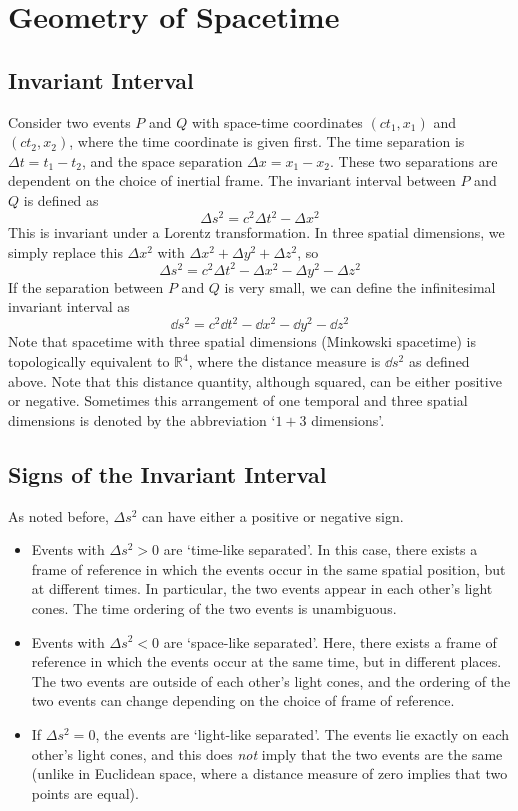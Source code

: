 \documentclass{article}
\begin{document}
\section{Geometry of Spacetime}
\subsection{Invariant Interval}
Consider two events $P$ and $Q$ with space-time coordinates $(ct_1, x_1)$ and $(ct_2, x_2)$, where the time coordinate is given first. The time separation is $\Delta t = t_1 - t_2$, and the space separation $\Delta x = x_1 - x_2$. These two separations are dependent on the choice of inertial frame. The invariant interval between $P$ and $Q$ is defined as
\[ \Delta s^2 = c^2 \Delta t^2 - \Delta x^2 \]
This is invariant under a Lorentz transformation. %
In three spatial dimensions, we simply replace this $\Delta x^2$ with $\Delta x^2 + \Delta y^2 + \Delta z^2$, so
\[ \Delta s^2 = c^2 \Delta t^2 - \Delta x^2 - \Delta y^2 - \Delta z^2 \]
If the separation between $P$ and $Q$ is very small, we can define the infinitesimal invariant interval as
\[ \dd{s}^2 = c^2\dd{t}^2 - \dd{x}^2 - \dd{y}^2 - \dd{z}^2 \]
Note that spacetime with three spatial dimensions (Minkowski spacetime) is topologically equivalent to $\mathbb R^4$, where the distance measure is $\dd{s}^2$ as defined above. Note that this distance quantity, although squared, can be either positive or negative. Sometimes this arrangement of one temporal and three spatial dimensions is denoted by the abbreviation `$1+3$ dimensions'.

\subsection{Signs of the Invariant Interval}
As noted before, $\Delta s^2$ can have either a positive or negative sign.
\begin{itemize}
	\item Events with $\Delta s^2 > 0$ are `time-like separated'. In this case, there exists a frame of reference in which the events occur in the same spatial position, but at different times. In particular, the two events appear in each other's light cones. The time ordering of the two events is unambiguous.
	\item Events with $\Delta s^2 < 0$ are `space-like separated'. Here, there exists a frame of reference in which the events occur at the same time, but in different places. The two events are outside of each other's light cones, and the ordering of the two events can change depending on the choice of frame of reference.
	\item If $\Delta s^2 = 0$, the events are `light-like separated'. The events lie exactly on each other's light cones, and this does \textit{not} imply that the two events are the same (unlike in Euclidean space, where a distance measure of zero implies that two points are equal).
\end{itemize}
\end{document}
